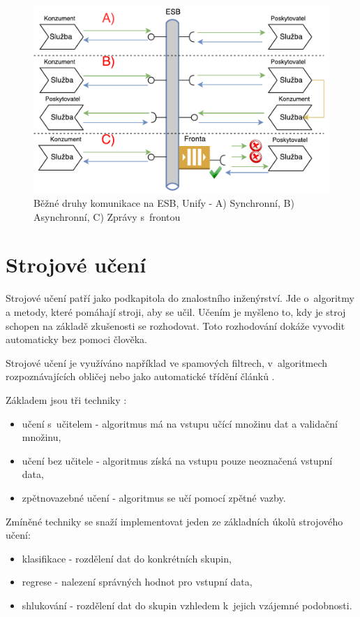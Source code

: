 \documentclass[thesis=M,czech]{FITthesis}[2012/10/20]
\newcommand{\tmpframe}[1]{\fbox{#1}}
\renewcommand{\tmpframe}[1]{#1}
\begin{document}
				\begin{figure}[htb]\centering
					\tmpframe{\includegraphics[width=\textwidth]{./img/basic_esb_communication}}		
					\caption{Běžné druhy komunikace na ESB, Unify - A) Synchronní, B) Asynchronní, C) Zprávy s~frontou}
					\label{fig:esb_communication}
				\end{figure}
	
	\section{Strojové učení}
		Strojové učení patří jako podkapitola do znalostního inženýrství. Jde o~algoritmy a metody, které pomáhají stroji, aby se učil. Učením je myšleno to, kdy je stroj schopen na základě zkušenosti se rozhodovat. Toto rozhodování dokáže vyvodit automaticky bez pomoci člověka. \cite{what-is-machine-learning}
		
		Strojové učení je využíváno například ve spamových filtrech, v~algoritmech rozpoznávajících obličej nebo jako automatické třídění článků \cite{machine-learning}.
		
		Základem jsou tři techniky \cite{machin-learning-and-opt}:
		
			\begin{itemize} 
				\item učení s~učitelem - algoritmus má na vstupu učící množinu dat a validační množinu,
				\item učení bez učitele - algoritmus získá na vstupu pouze neoznačená vstupní data,
				\item zpětnovazebné učení - algoritmus se učí pomocí zpětné vazby.
			\end{itemize}
		
		Zmíněné techniky se snaží implementovat jeden ze základních úkolů strojového učení:
			\begin{itemize} 
				\item klasifikace - rozdělení dat do konkrétních skupin,
				\item regrese - nalezení správných hodnot pro vstupní data,
				\item shlukování - rozdělení dat do skupin vzhledem k~jejich vzájemné podobnosti.
			\end{itemize}
			
\end{document}
